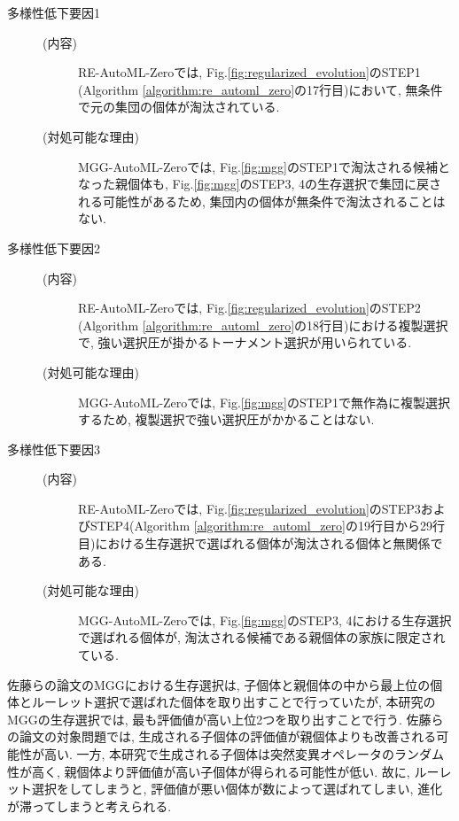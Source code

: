 \documentclass[11pt,oneside,openany,report]{jsbook}
\begin{document}
\begin{description}
  \item[多様性低下要因1]
    \begin{description}
      \item[(内容)] RE-AutoML-Zeroでは, Fig.\ref{fig:regularized_evolution}のSTEP1 (Algorithm \ref{algorithm:re_automl_zero}の17行目)において, 無条件で元の集団の個体が淘汰されている.
      \item[(対処可能な理由)] MGG-AutoML-Zeroでは, Fig.\ref{fig:mgg}のSTEP1で淘汰される候補となった親個体も, Fig.\ref{fig:mgg}のSTEP3, 4の生存選択で集団に戻される可能性があるため, 集団内の個体が無条件で淘汰されることはない.
    \end{description}
  \item[多様性低下要因2]
    \begin{description}
      \item[(内容)] RE-AutoML-Zeroでは, Fig.\ref{fig:regularized_evolution}のSTEP2 (Algorithm \ref{algorithm:re_automl_zero}の18行目)における複製選択で, 強い選択圧が掛かるトーナメント選択が用いられている.
      \item[(対処可能な理由)] MGG-AutoML-Zeroでは, Fig.\ref{fig:mgg}のSTEP1で無作為に複製選択するため, 複製選択で強い選択圧がかかることはない.
    \end{description}
  \item[多様性低下要因3]
    \begin{description}
      \item[(内容)] RE-AutoML-Zeroでは, Fig.\ref{fig:regularized_evolution}のSTEP3およびSTEP4(Algorithm \ref{algorithm:re_automl_zero}の19行目から29行目)における生存選択で選ばれる個体が淘汰される個体と無関係である.
      \item[(対処可能な理由)] MGG-AutoML-Zeroでは, Fig.\ref{fig:mgg}のSTEP3, 4における生存選択で選ばれる個体が, 淘汰される候補である親個体の家族に限定されている.
    \end{description}
\end{description}

佐藤らの論文\cite{mgg}のMGGにおける生存選択は, 子個体と親個体の中から最上位の個体とルーレット選択で選ばれた個体を取り出すことで行っていたが, 本研究のMGGの生存選択では, 最も評価値が高い上位2つを取り出すことで行う. 佐藤らの論文\cite{mgg}の対象問題では, 生成される子個体の評価値が親個体よりも改善される可能性が高い. 一方, 本研究で生成される子個体は突然変異オペレータのランダム性が高く, 親個体より評価値が高い子個体が得られる可能性が低い. 故に, ルーレット選択をしてしまうと, 評価値が悪い個体が数によって選ばれてしまい, 進化が滞ってしまうと考えられる.
\end{document}
